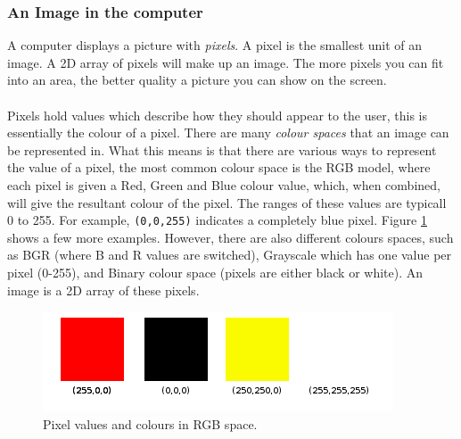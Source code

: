 \documentclass[11pt]{article}
\begin{document}
\subsubsection{An Image in the computer}
A computer displays a picture with \textit{pixels}. A pixel is the
smallest unit of an image. A 2D array of pixels will make up an image.
The more pixels you can fit into an area, the better quality a picture
you can show on the screen.\\
\\
Pixels hold values which describe how they should appear to the user, this is
essentially the colour of a pixel. There are many \textit{colour spaces} that
an image can be represented in. What this means is that there are
various ways to represent the value of a pixel, the most common colour
space is the RGB model, where each pixel is given a Red, Green and Blue
colour value, which, when combined, will give the resultant colour of the
pixel. The ranges of these values are typicall 0 to 255. 
For example, \texttt{(0,0,255)} indicates a completely blue pixel. 
Figure \ref{fig:pixels} shows a few more examples. However, there are 
also different colours spaces, such as BGR (where B and R values are
switched), Grayscale which has one value per pixel (0-255), and Binary
colour space (pixels are either black or white).
An image is a 2D array of these pixels.

\begin{figure}
	\centering
	\includegraphics[scale=0.9]{pics/pixels.png}
	\caption{Pixel values and colours in RGB space.}
	\label{fig:pixels}
\end{figure}
\end{document}
